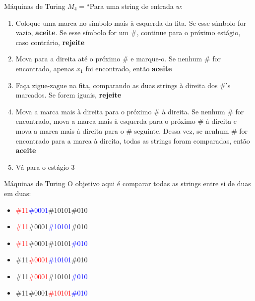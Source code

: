 \documentclass{beamer}
\begin{document}
\begin{frame}{Máquinas de Turing}
	$M_{4} = $``Para uma string de entrada $w$:
	\begin{enumerate}
		\item Coloque uma marca no símbolo mais à esquerda da fita. Se esse símbolo for vazio, \textbf{aceite}. Se esse símbolo for um \#, continue para o próximo estágio, caso contrário, \textbf{rejeite}
		\item Mova para a direita até o próximo \# e marque-o. Se nenhum \# for encontrado, apenas $x_{1}$ foi encontrado, então \textbf{aceite}
		\item Faça zigue-zague na fita, comparando as duas strings à direita dos \#'s marcados. Se forem iguais, \textbf{rejeite}
		\item Mova a marca mais à direita para o próximo \# à direita. Se nenhum \# for encontrado, mova a marca mais à esquerda para o próximo \# à direita e mova a marca mais à direita para o \# seguinte. Dessa vez, se nenhum \# for encontrado para a marca à direita, todas as strings foram comparadas, então \textbf{aceite}
		\item Vá para o estágio 3
	\end{enumerate}
\end{frame}
\begin{frame}{Máquinas de Turing}
	O objetivo aqui é comparar todas as strings entre si de duas em duas:
	\begin{itemize}
		\item \textcolor{red}{\#11}\textcolor{blue}{\#0001}\#10101\#010
		\item \textcolor{red}{\#11}\#0001\textcolor{blue}{\#10101}\#010
		\item \textcolor{red}{\#11}\#0001\#10101\textcolor{blue}{\#010}
		\item \#11\textcolor{red}{\#0001}\textcolor{blue}{\#10101}\#010
		\item \#11\textcolor{red}{\#0001}\#10101\textcolor{blue}{\#010}
		\item \#11\#0001\textcolor{red}{\#10101}\textcolor{blue}{\#010}
	\end{itemize}
\end{frame}
\end{document}

